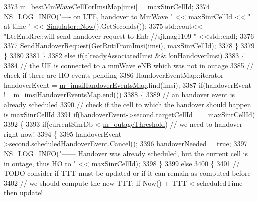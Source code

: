 \begin{DoxyCode}
3373         \hyperlink{classns3_1_1LteEnbRrc_a38d5bf3d53b16596824f07d4b4a1eab7}{m\_bestMmWaveCellForImsiMap}[imsi] = maxSinrCellId;
3374         \hyperlink{group__logging_gafbd73ee2cf9f26b319f49086d8e860fb}{NS\_LOG\_INFO}(\textcolor{stringliteral}{"---- on LTE, handover to MmWave "} << maxSinrCellId << \textcolor{stringliteral}{" at time "} << 
      \hyperlink{classns3_1_1Simulator_ac3178fa975b419f7875e7105be122800}{Simulator::Now}().GetSeconds());
3375         std::cout<< \textcolor{stringliteral}{"LteEnbRrc::will send handover request to Enb //sjknag1109 "} <<std::endl;
3376 
3377         \hyperlink{classns3_1_1LteEnbRrc_aafad8f02e2086dafea2bc4b48793a392}{SendHandoverRequest}(\hyperlink{classns3_1_1LteEnbRrc_a98f4b8f727e844ab621e447b7178ddc2}{GetRntiFromImsi}(imsi), maxSinrCellId);
3378       \}
3379     \}
3380      
3381   \}
3382   \textcolor{keywordflow}{else} \textcolor{keywordflow}{if}(alreadyAssociatedImsi && !onHandoverImsi)
3383   \{
3384     \textcolor{comment}{// the UE is connected to a mmWave eNB which was not in outage}
3385     \textcolor{comment}{// check if there are HO events pending}
3386     HandoverEventMap::iterator handoverEvent = \hyperlink{classns3_1_1LteEnbRrc_a6f703158e9a4ceaccbd1c5df7f5b0ba1}{m\_imsiHandoverEventsMap}.find(imsi); 
3387     \textcolor{keywordflow}{if}(handoverEvent != \hyperlink{classns3_1_1LteEnbRrc_a6f703158e9a4ceaccbd1c5df7f5b0ba1}{m\_imsiHandoverEventsMap}.end())
3388     \{
3389       \textcolor{comment}{// an handover event is already scheduled}
3390       \textcolor{comment}{// check if the cell to which the handover should happen is maxSinrCellId}
3391       \textcolor{keywordflow}{if}(handoverEvent->second.targetCellId == maxSinrCellId)
3392       \{
3393         \textcolor{keywordflow}{if}(currentSinrDb < \hyperlink{classns3_1_1LteEnbRrc_adf505b71799b8dbd81372695f14a0716}{m\_outageThreshold}) \textcolor{comment}{// we need to handover right now!}
3394         \{
3395           handoverEvent->second.scheduledHandoverEvent.Cancel();
3396           handoverNeeded = \textcolor{keyword}{true};
3397           \hyperlink{group__logging_gafbd73ee2cf9f26b319f49086d8e860fb}{NS\_LOG\_INFO}(\textcolor{stringliteral}{"------ Handover was already scheduled, but the current cell is in outage,
       thus HO to "} << maxSinrCellId);
3398         \}
3399         \textcolor{keywordflow}{else}
3400         \{
3401           \textcolor{comment}{// TODO consider if TTT must be updated or if it can remain as computed before}
3402           \textcolor{comment}{// we should compute the new TTT: if Now() + TTT < scheduledTime then update!}

\end{DoxyCode}
